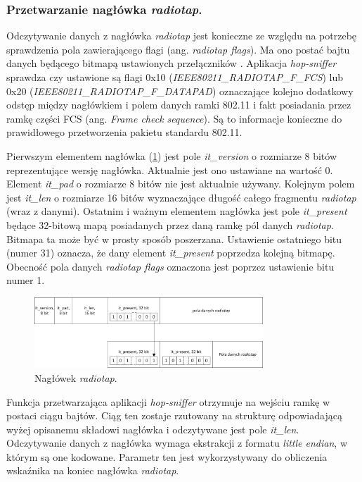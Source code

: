 \subsubsection{Przetwarzanie nagłówka \emph{radiotap}.}

Odczytywanie danych z nagłówka \emph{radiotap} jest konieczne ze względu na potrzebę sprawdzenia pola zawierającego flagi (ang. \emph{radiotap flags}). Ma ono postać bajtu danych będącego bitmapą ustawionych przełączników . Aplikacja \emph{hop-sniffer} sprawdza czy ustawione są flagi 0x10 (\emph{IEEE80211\_RADIOTAP\_F\_FCS}) lub 0x20 (\emph{IEEE80211\_RADIOTAP\_F\_DATAPAD}) oznaczające kolejno dodatkowy odstęp między nagłówkiem i polem danych ramki 802.11 i fakt posiadania przez ramkę części FCS (ang. \emph{Frame check sequence}). Są to informacje konieczne do prawidłowego przetworzenia pakietu standardu 802.11.

Pierwszym elementem nagłówka (\ref{RadiotapHeader}) jest pole \emph{it\_version} o rozmiarze 8 bitów reprezentujące wersję nagłówka. Aktualnie jest ono ustawiane na wartość 0. Element \emph{it\_pad} o rozmiarze 8 bitów nie jest aktualnie używany. Kolejnym polem jest \emph{it\_len} o rozmiarze 16 bitów wyznaczające długość całego fragmentu \emph{radiotap} (wraz z danymi). Ostatnim i ważnym elementem nagłówka jest pole \emph{it\_present} będące 32-bitową mapą posiadanych przez daną ramkę pól danych \emph{radiotap}. Bitmapa ta może być w prosty sposób poszerzana. Ustawienie ostatniego bitu (numer 31) oznacza, że dany element \emph{it\_present} poprzedza kolejną bitmapę. Obecność pola danych \emph{radiotap flags} oznaczona jest poprzez ustawienie bitu numer 1. 

\begin{figure}[htb]
\begin{center}
\includegraphics[width=325px]{img/RadiotapHeader}
\caption{Nagłówek \emph{radiotap}.}
\label{RadiotapHeader}
\end{center}
\end{figure}

Funkcja przetwarzająca aplikacji \emph{hop-sniffer} otrzymuje na wejściu ramkę w postaci ciągu bajtów. Ciąg ten zostaje rzutowany na strukturę odpowiadającą wyżej opisanemu składowi nagłówka i odczytywane jest pole \emph{it\_len}. Odczytywanie danych z nagłówka wymaga ekstrakcji z formatu \emph{little endian}, w którym są one kodowane. Parametr ten jest wykorzystywany do obliczenia wskaźnika na koniec nagłówka \emph{radiotap}.

